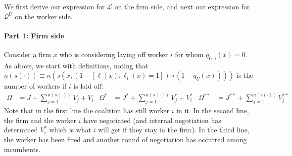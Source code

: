 We first derive our expression for $\mathcal{L}$ on the firm side, and next our expression for $\mathcal{Q}^U$ on the worker side.

\paragraph{Part 1: Firm side}

Consider a firm $x$ who is considering laying off worker $i$ for whom $%
q_{U,i}\left( x\right) =0$. As above, we start with definitions, noting that
$n(s(\cdot)) \equiv n\left( s\left( x,\left( 1-\left[ \ell \left( x\right) ;\ell _{i}\left(
x\right) =1\right] \right) \circ \left( 1-q_{U}\left( x\right) \right)
\right) \right) $ is the number of workers if $i$ is laid off:
\begin{align*}
\Omega & =J+\sum_{j=1}^{n\left( s\left( \cdot \right) \right) }V_{j}+V_{i} &
\Omega ^{\ast }& =J^{\ast }+\sum_{j=1}^{n\left( s\left( \cdot \right)
\right) }V_{j}^{\ast }+V_{i}^{\ast } &
\Omega ^{\ast \ast }& =J^{\ast \ast }+\sum_{j=1}^{n\left( s\left( \cdot
\right) \right) }V_{j}^{\ast \ast }
\end{align*}
Note that in the first line the coalition has still worker $i$ in it. In the
second line, the firm and the worker $i$ have negotiated (and internal
negotiation has determined $V_{i}^{\ast }$ which is what $i$ will get if
they stay in the firm). In the third line, the worker has been fired and
another round of negotiation has occurred among incumbents.

